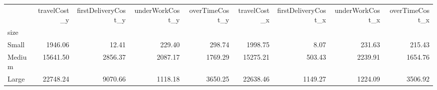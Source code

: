 \begin{tabular}{lrrrrrrrr}
\toprule
{} &  travelCost\_y &  firstDeliveryCost\_y &  underWorkCost\_y &  overTimeCost\_y &  travelCost\_x &  firstDeliveryCost\_x &  underWorkCost\_x &  overTimeCost\_x \\
size   &               &                      &                  &                 &               &                      &                  &                 \\
\midrule
Small  &       1946.06 &                12.41 &           229.40 &          298.74 &       1998.75 &                 8.07 &           231.63 &          215.43 \\
Medium &      15641.50 &              2856.37 &          2087.17 &         1769.29 &      15275.21 &               503.43 &          2239.91 &         1654.76 \\
Large  &      22748.24 &              9070.66 &          1118.18 &         3650.25 &      22638.46 &              1149.27 &          1224.09 &         3506.92 \\
\bottomrule
\end{tabular}
